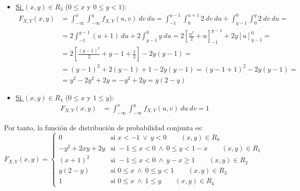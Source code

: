 \documentclass[12pt]{article}
\begin{document}
\begin{ejercicio}[5 puntos]
\begin{enumerate}
\begin{itemize}
                \item \ul{Si $(x,y)\in R_3$} ($0\leq x$ y $0\leq y<1$):
                \begin{align*}
                    F_{X,Y}(x,y) &= \int_{-\infty}^{x}\int_{-\infty}^{y} f_{X,Y}(u,v) \ dv \ du
                    = \int_{-1}^{y-1}\int_{0}^{u+1} 2 \ dv \ du
                    + \int_{y-1}^{0}\int_{0}^{y} 2 \ dv \ du
                    =\\&= 2\int_{-1}^{y-1} (u+1) \ du + 2\int_{y-1}^{0} y \ du
                    = 2\left[\frac{u^2}{2}+u\right]_{-1}^{y-1} + 2y\left[u\right]_{y-1}^{0}
                    =\\&= 2\left[\frac{(y-1)^2}{2} + y-1+\frac{1}{2}\right] - 2y(y-1)
                    =\\&= (y-1)^2 + 2(y-1)+1 - 2y(y-1)
                    = (y-1+1)^2 - 2y(y-1)
                    =\\&= y^2 - 2y^2 + 2y = -y^2 + 2y = y(2-y)
                \end{align*}

                \item \ul{Si $(x,y)\in R_4$} ($0\leq x$ y $1\leq y$):
                \begin{align*}
                    F_{X,Y}(x,y) &= \int_{-\infty}^{x}\int_{-\infty}^{y} f_{X,Y}(u,v) \ du \ dv
                    = 1
                \end{align*}
            \end{itemize}

            Por tanto, la función de distribución de probabilidad conjunta es:
            \begin{equation*}
                F_{X,Y}(x,y) = \begin{cases}
                    0 & \text{si } x<-1 \ \lor \ y<0 \qquad (x,y)\in R_0 \\
                    -y^2 + 2xy + 2y & \text{si } -1\leq x<0 \ \land \ 0\leq y<1-x \qquad (x,y)\in R_1 \\
                    (x+1)^2 & \text{si } -1\leq x<0 \ \land \ y-x\geq 1 \qquad (x,y)\in R_2 \\
                    y(2-y) & \text{si } 0\leq x \ \land \ 0\leq y<1 \qquad (x,y)\in R_3 \\
                    1 & \text{si } 0\leq x \ \land \ 1\leq y \qquad (x,y)\in R_4
                \end{cases}
            \end{equation*}



\end{enumerate}
\end{ejercicio}
\end{document}
